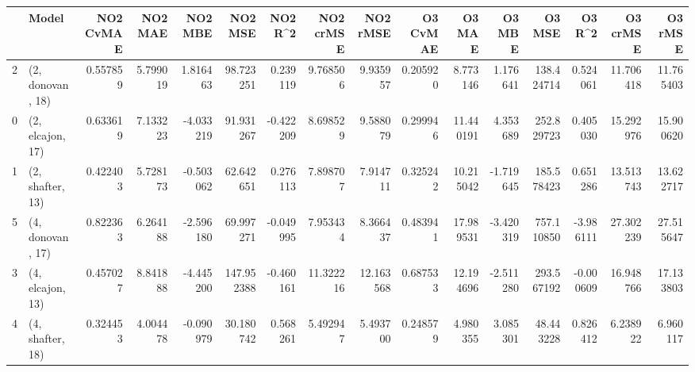\begin{tabular}{llrrrrrrrrrrrrrr}
\toprule
{} &             Model &  NO2 CvMAE &   NO2 MAE &   NO2 MBE &     NO2 MSE &   NO2 R\textasciicircum2 &  NO2 crMSE &   NO2 rMSE &  O3 CvMAE &     O3 MAE &    O3 MBE &      O3 MSE &    O3 R\textasciicircum2 &   O3 crMSE &    O3 rMSE \\
\midrule
2 &  (2, donovan, 18) &   0.557859 &  5.799019 &  1.816463 &   98.723251 &  0.239119 &   9.768506 &   9.935957 &  0.205920 &   8.773146 &  1.176641 &  138.424714 &  0.524061 &  11.706418 &  11.765403 \\
0 &  (2, elcajon, 17) &   0.633619 &  7.133223 & -4.033219 &   91.931267 & -0.422209 &   8.698529 &   9.588079 &  0.299946 &  11.440191 &  4.353689 &  252.829723 &  0.405030 &  15.292976 &  15.900620 \\
1 &  (2, shafter, 13) &   0.422403 &  5.728173 & -0.503062 &   62.642651 &  0.276113 &   7.898707 &   7.914711 &  0.325242 &  10.215042 & -1.719645 &  185.578423 &  0.651286 &  13.513743 &  13.622717 \\
5 &  (4, donovan, 17) &   0.822363 &  6.264188 & -2.596180 &   69.997271 & -0.049995 &   7.953434 &   8.366437 &  0.483941 &  17.989531 & -3.420319 &  757.110850 & -3.986111 &  27.302239 &  27.515647 \\
3 &  (4, elcajon, 13) &   0.457027 &  8.841888 & -4.445200 &  147.952388 & -0.460161 &  11.322216 &  12.163568 &  0.687533 &  12.194696 & -2.511280 &  293.567192 & -0.000609 &  16.948766 &  17.133803 \\
4 &  (4, shafter, 18) &   0.324453 &  4.004478 & -0.090979 &   30.180742 &  0.568261 &   5.492947 &   5.493700 &  0.248579 &   4.980355 &  3.085301 &   48.443228 &  0.826412 &   6.238922 &   6.960117 \\
\bottomrule
\end{tabular}
